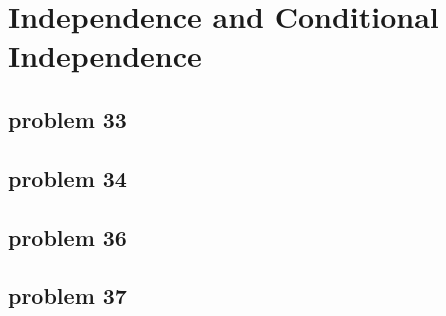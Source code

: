 \section{Independence and Conditional Independence}

\subsection{problem 33}


\subsection{problem 34}


\subsection{problem 36}


\subsection{problem 37}



